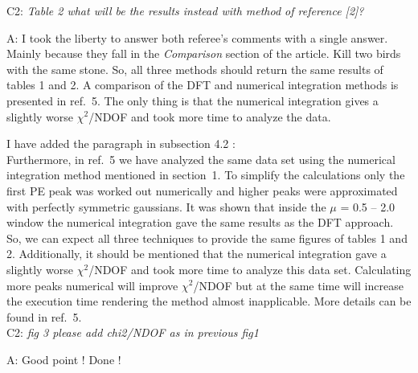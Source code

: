 \documentclass[a4paper,11pt]{article}
\begin{document}
C2: \emph{Table 2 what will be the results instead with method of reference [2]?}

A: I took the liberty to answer both referee's comments with a single answer. 
Mainly because they fall in the \emph{Comparison} section of the article. Kill two birds with the same stone. 
So, all three methods should return the same results of tables 1 and 2. 
A comparison of the DFT and numerical integration methods is presented in ref.~5. 
The only thing is that the numerical integration gives a slightly worse  $\chi^2$/NDOF and took more time to analyze the data.  
 
I have added the paragraph in subsection 4.2 :
\\[1ex]

Furthermore, in ref.~5 we have analyzed the same data set using the numerical integration method mentioned in section~1.  
To simplify the calculations only the first PE peak was worked out numerically and higher peaks were approximated with perfectly symmetric gaussians. 
It was shown that inside the $\mu$ = 0.5 -- 2.0 window the numerical integration gave the same results as the DFT approach. 
So, we can expect all three techniques to provide the same figures of tables 1 and 2. 
Additionally, it should be mentioned that the numerical integration gave a slightly worse $\chi^2$/NDOF and took more time to analyze this data set. 
Calculating more peaks numerical will improve $\chi^2$/NDOF but at the same time will increase the execution time rendering the method almost inapplicable. 
More details can be found in ref.~5. 
\\[1ex]

C2: \emph{fig 3 please add chi2/NDOF as in previous fig1}

A: Good point ! Done !
\end{document}
